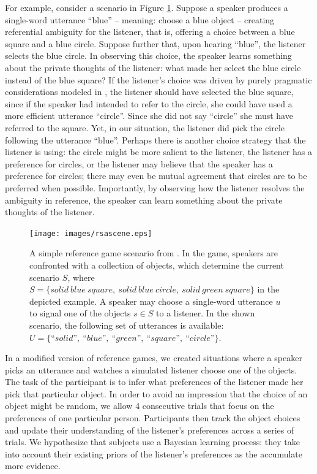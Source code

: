 \documentclass[10pt,a4paper]{article}
\begin{document}
For example, consider a scenario in  Figure \ref{FG-ref-game}. Suppose a speaker produces a single-word utterance ``blue'' -- meaning: choose a blue object -- creating referential ambiguity for the listener, that is, offering a choice between a blue square and a blue circle. 
Suppose further that, upon hearing ``blue'', the listener selects the blue circle.
In observing this choice, the speaker learns something about the private thoughts of the listener: what made her select the blue circle instead of the blue square? If the listener's choice was driven by purely pragmatic considerations modeled in , the listener should have selected the blue square, since if the speaker had intended to refer to the circle, she could have used a more efficient utterance ``circle''. Since she did not say ``circle'' she must have referred to the square. Yet, in our situation, the listener did pick the circle following the utterance ``blue''. Perhaps there is another choice strategy that the listener is using: the circle might be more salient to the listener, the listener has a preference for circles, or the listener may believe that the speaker has a preference for circles; there may even be mutual agreement that circles are to be preferred when possible. Importantly, by observing how the listener resolves the ambiguity in reference, the speaker can learn something about the private thoughts of the listener.

\begin{figure}
	\centering
	\texttt{[image: images/rsascene.eps]}
	\caption{A simple reference game scenario from \protect{}.
		In the game, speakers are confronted with a collection of objects, which determine the current scenario $S$, where $S=\{solid\ blue\ square,\ solid\ blue\ circle,\ solid\ green\ square\}$ in the depicted example. 
		A speaker may choose a single-word utterance $u$ to signal one of the objects $s\in S$ to a listener.
		In the shown scenario, the following set of utterances is available: $U =\{\textit{``solid''},\ \textit{``blue''},\ \textit{``green''},\ \textit{``square''},\ \textit{``circle''}\}$.
	}
	\label{FG-ref-game}
\end{figure}


In a modified version of reference games, we created situations where a speaker picks an utterance and watches a simulated listener choose one of the objects. The task of the participant is to infer what preferences of the listener made her pick that particular object. In order to avoid an impression that the choice of an object might be random, we allow 4 consecutive trials that focus on the preferences of one particular person. Participants then track the object choices and update their understanding of the listener's preferences across a series of trials. 
We hypothesize that subjects use a Bayesian learning process: they take into account their existing priors of the listener's preferences as the accumulate more evidence.
\end{document}
